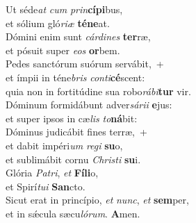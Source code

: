 \evenverse Ut séde\textit{at} \textit{cum} \textit{prin}\textbf{cí}\textbf{pi}bus,~\*\\
\evenverse et sólium gló\textit{ri}\textit{æ} \textbf{té}\textbf{ne}at.\\
\oddverse Dómini enim sunt \textit{cár}\textit{di}\textit{nes} \textbf{ter}ræ,~\*\\
\oddverse et pósuit super \textit{e}\textit{os} \textbf{or}bem.\\
\evenverse Pedes sanctórum suórum servábit,~+\\
\evenverse  et ímpii in téne\textit{bris} \textit{con}\textit{ti}\textbf{cé}scent:~\*\\
\evenverse quia non in fortitúdine sua robo\textit{rá}\textit{bi}\textbf{tur} vir.\\
\oddverse Dóminum formidábunt adver\textit{sá}\textit{ri}\textit{i} \textbf{e}jus:~\*\\
\oddverse et super ipsos in cæ\textit{lis} \textit{to}\textbf{ná}bit:\\
\evenverse Dóminus judicábit fines terræ,~+\\
\evenverse  et dabit impéri\textit{um} \textit{re}\textit{gi} \textbf{su}o,~\*\\
\evenverse et sublimábit cornu \textit{Chri}\textit{sti} \textbf{su}i.\\
\oddverse Glória \textit{Pa}\textit{tri}, \textit{et} \textbf{Fí}\textbf{li}o,~\*\\
\oddverse et Spirí\textit{tu}\textit{i} \textbf{San}cto.\\
\evenverse Sicut erat in princípio, \textit{et} \textit{nunc}, \textit{et} \textbf{sem}per,~\*\\
\evenverse et in sǽcula sæcu\textit{ló}\textit{rum}. \textbf{A}men.\\
